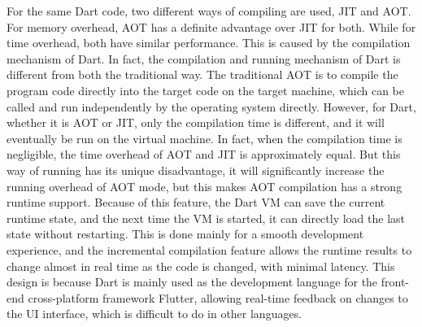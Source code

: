 For the same Dart code, two different ways of compiling are used, JIT and AOT. For memory overhead, AOT has a definite advantage over JIT for both. While for time overhead, both have similar performance. This is caused by the compilation mechanism of Dart. In fact, the compilation and running mechanism of Dart is different from both the traditional way. The traditional AOT is to compile the program code directly into the target code on the target machine, which can be called and run independently by the operating system directly. However, for Dart, whether it is AOT or JIT, only the compilation time is different, and it will eventually be run on the virtual machine. In fact, when the compilation time is negligible, the time overhead of AOT and JIT is approximately equal. But this way of running has its unique disadvantage, it will significantly increase the running overhead of AOT mode, but this makes AOT compilation has a strong runtime support. Because of this feature, the Dart VM can save the current runtime state, and the next time the VM is started, it can directly load the last state without restarting. This is done mainly for a smooth development experience, and the incremental compilation feature allows the runtime results to change almost in real time as the code is changed, with minimal latency. This design is because Dart is mainly used as the development language for the front-end cross-platform framework Flutter, allowing real-time feedback on changes to the UI interface, which is difficult to do in other languages.


